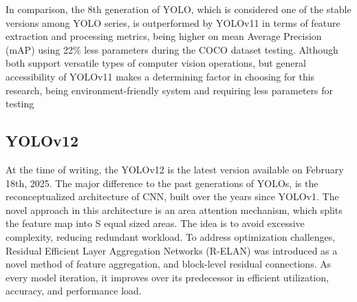 \begin{multicols}{2}
In comparison, the 8th generation of YOLO, which is considered one of the stable versions among YOLO series, is outperformed by YOLOv11 in terms of feature extraction and processing metrics, being higher on mean Average Precision (mAP) using 22\% less parameters during the COCO dataset testing. Although both support versatile types of computer vision operations, but general accessibility of YOLOv11 makes a determining factor in choosing for this research, being environment-friendly system and requiring less parameters for testing

\subsection{YOLOv12}
At the time of writing, the YOLOv12 is the latest version available on February 18th, 2025. The major difference to the past generations of YOLOs, is the reconceptualized architecture of CNN, built over the years since YOLOv1. The novel approach in this architecture is an area attention mechanism, which splits the feature map into S equal sized areas. The idea is to avoid excessive complexity, reducing redundant workload. To address optimization challenges, Residual Efficient Layer Aggregation Networks (R-ELAN) was introduced as a novel method of feature aggregation, and block-level residual connections. As every model iteration, it improves over its predecessor in efficient utilization, accuracy, and performance load.

\end{multicols}